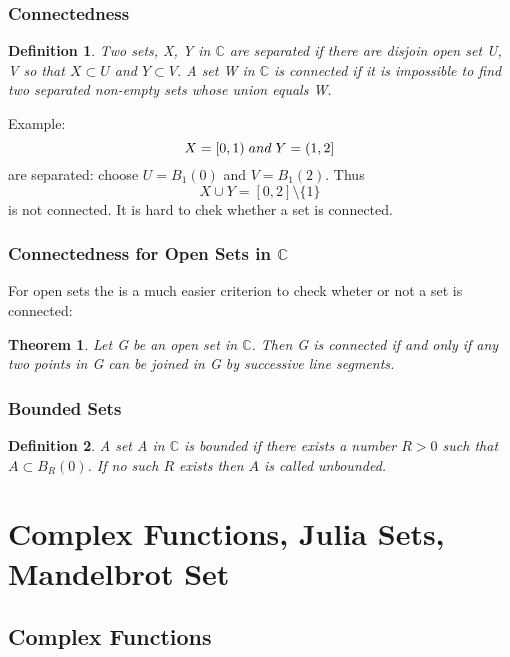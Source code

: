 \documentclass{article}
\newtheorem{theorem}{Theorem}[section]
\newtheorem{definition}{Definition}[section]
\begin{document}
\subsubsection{Connectedness}
\begin{definition}
Two sets, X, Y in $\mathbb{C}$ are separated if there are disjoin open set U, V so that $X \subset U$ and $Y \subset V$. A set W in $\mathbb{C}$ is connected if it is impossible to find two separated non-empty sets whose union equals W.
\end{definition}
Example:
\begin{equation*}
X = [0, 1) \hspace{0.1cm} and \hspace{0.1cm} Y=(1,2]
\end{equation*}
are separated: choose $U = B_1(0)$ and $ V = B_1(2)$. Thus
\begin{equation*}
X \cup Y = [0,2] \setminus \{1\}
\end{equation*}
is not connected. It is hard to chek whether a set is connected.

\subsubsection{Connectedness for Open Sets in $\mathbb{C}$}
For open sets the is a much easier criterion to check wheter or not a set is connected:
\begin{theorem}
Let G be an open set in $\mathbb{C}$. Then G is connected if and only if any two points in G can be joined in G by successive line segments.
\end{theorem}

\subsubsection{Bounded Sets}
\begin{definition}
A set A in $\mathbb{C}$ is bounded if there exists a number $R > 0$ such that $A \subset B_R(0)$. If no such $R$ exists then $A$ is called unbounded.
\end{definition}

\section{Complex Functions, Julia Sets, Mandelbrot Set}

\subsection{Complex Functions}
\end{document}
